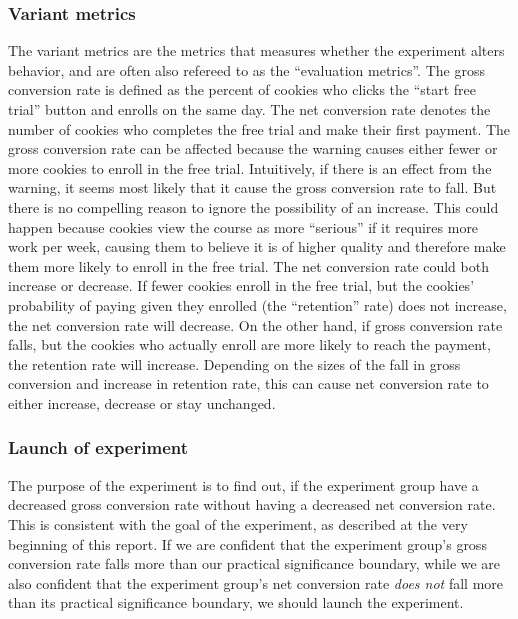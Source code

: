 \documentclass[12pt]{article}
\begin{document}
\subsubsection{Variant metrics}
The variant metrics are the metrics that measures whether the experiment alters behavior, and are often also refereed to as the ``evaluation metrics''. The gross conversion rate is defined as the percent of cookies who clicks the ``start free trial'' button and enrolls on the same day. The net conversion rate denotes the number of cookies who completes the free trial and make their first payment.
\newline
The gross conversion rate can be affected because the warning causes either fewer or more cookies to enroll in the free trial. Intuitively, if there is an effect from the warning, it seems most likely that it cause the gross conversion rate to fall. But there is no compelling reason to ignore the possibility of an increase. This could happen because cookies view the course as more ``serious'' if it requires more work per week, causing them to believe it is of higher quality and therefore make them more likely to enroll in the free trial.
\newline
The net conversion rate could both increase or decrease. If fewer cookies enroll in the free trial, but the cookies' probability of paying given they enrolled (the ``retention'' rate) does not increase, the net conversion rate will decrease. On the other hand, if gross conversion rate falls, but the cookies who actually enroll are more likely to reach the payment, the retention rate will increase. Depending on the sizes of the fall in gross conversion and increase in retention rate, this can cause net conversion rate to either increase, decrease or stay unchanged.

\subsubsection{Launch of experiment}
The purpose of the experiment is to find out, if the experiment group have a decreased gross conversion rate without having a decreased net conversion rate. This is consistent with the goal of the experiment, as described at the very beginning of this report. \newline
If we are confident that the experiment group's gross conversion rate falls more than our practical significance boundary, while we are also confident that the experiment group's net conversion rate \textit{does not} fall more than its practical significance boundary, we should launch the experiment.
\end{document}
